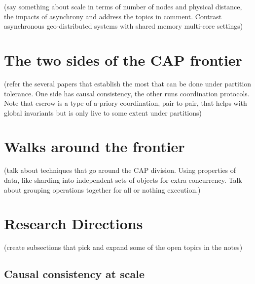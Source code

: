 \begin{bibunit}
        (say something about scale in terms of number of nodes and physical distance, the impacts of asynchrony and address the topics in comment. Contrast asynchronous geo-distributed systems with shared memory multi-core settings)

        \section{The two sides of the CAP frontier}\label{sec:2}


        (refer the several papers that establish the most that can be done under partition tolerance. One side has causal consistency, the other runs coordination protocols. Note that escrow is a type of a-priory coordination, pair to pair, that helps with global invariants but is only live to some extent under partitions)

        \section{Walks around the frontier}\label{sec:2}


        (talk about techniques that go around the CAP division. Using properties of data, like sharding into independent sets of objects for extra concurrency. Talk about grouping operations together for all or nothing execution.)

        \section{Research Directions}\label{sec:2}

        (create subsections that pick and expand some of the open topics in the notes)

        \subsection{Causal consistency at scale}


\end{bibunit}
